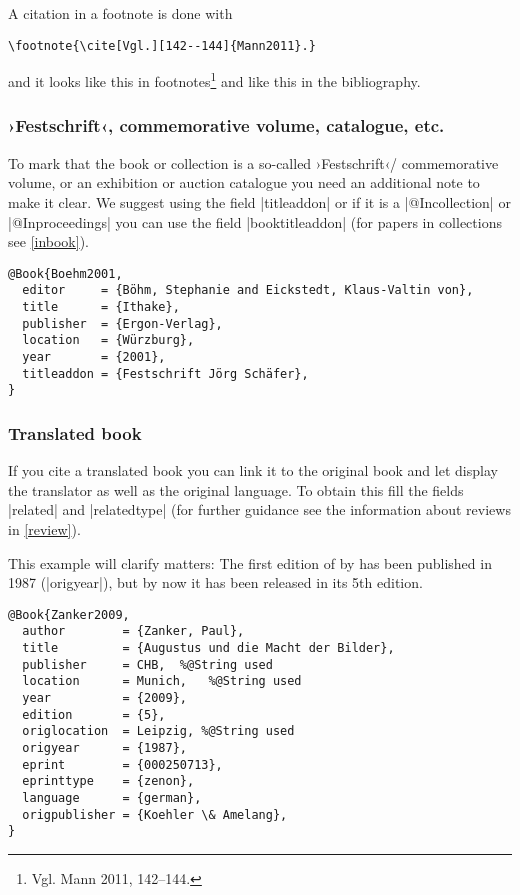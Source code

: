 \documentclass[a4paper,
10pt,
greek,
french,
spanish,
italian,
ngerman,
english
]{ltxdoc}
\begin{document}
A citation in a footnote is done with
\begin{lstlisting}
\footnote{\cite[Vgl.][142--144]{Mann2011}.}
\end{lstlisting} 

and it looks like this in footnotes\footnote{Vgl. Mann 2011, 142--144.}
and like this in the bibliography.

\subsubsection{›Festschrift‹, commemorative volume, catalogue, etc.}
To mark that the book or collection is a so-called ›Festschrift‹/ commemorative volume, 
or an exhibition or auction catalogue you need an additional note to make it clear.
We suggest using  the field |titleaddon| or if it is a |@Incollection| or |@Inproceedings| you can use the field |booktitleaddon| (for papers in collections see \cref{inbook}).
\begin{lstlisting}[style=bibentry,label=Boehm2001,caption={{@}Book\{Boehm2001,…\} }]
@Book{Boehm2001,
  editor     = {Böhm, Stephanie and Eickstedt, Klaus-Valtin von},
  title      = {Ithake},
  publisher  = {Ergon-Verlag},
  location   = {Würzburg},
  year       = {2001},
  titleaddon = {Festschrift Jörg Schäfer},
}
\end{lstlisting}

 
\subsubsection{Translated book}
If you cite a translated book you can link it to the original book and let display the translator as well as the original language. 
To obtain this fill the fields |related| and |relatedtype| (for further guidance see the information about reviews in \cref{review}).

This example will clarify matters:
The first edition of  by \citeauthor*{Zanker2009} has been published in 1987 (|origyear|), but by now it has been released in its 5th edition.

\begin{lstlisting}[style=bibentry,label=Zanker2009,caption={{@}Book\{Zanker2009,…\} }]
@Book{Zanker2009,
  author        = {Zanker, Paul},
  title         = {Augustus und die Macht der Bilder},
  publisher     = CHB, 	%@String used
  location      = Munich,	%@String used
  year          = {2009},
  edition       = {5},
  origlocation  = Leipzig, %@String used
  origyear      = {1987},
  eprint        = {000250713},
  eprinttype    = {zenon},
  language      = {german},
  origpublisher = {Koehler \& Amelang},
}
\end{lstlisting}
\end{document}
